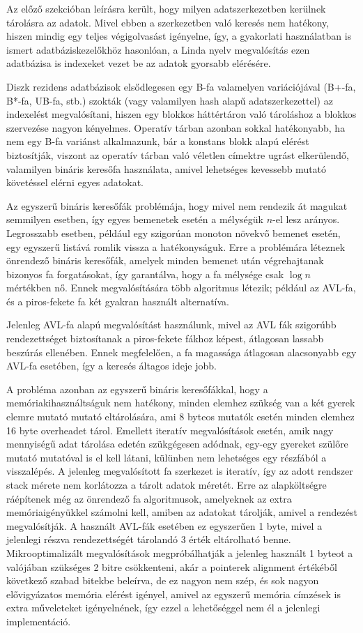 Az előző szekcióban leírásra került, hogy milyen adatszerkezetben kerülnek tárolásra az adatok.
Mivel ebben a szerkezetben való keresés nem hatékony, hiszen mindig egy teljes végigolvasást igényelne, így, a gyakorlati használatban is ismert adatbáziskezelőkhöz hasonlóan, a Linda nyelv megvalósítás ezen adatbázisa is indexeket vezet be az adatok gyorsabb elérésére.

Diszk rezidens adatbázisok elsődlegesen egy B-fa valamelyen variációjával (B+-fa, B*-fa, UB-fa, stb.) szokták (vagy valamilyen hash alapű adatszerkezettel) az indexelést megvalósítani, hiszen egy blokkos háttértáron való tároláshoz a blokkos szervezése nagyon kényelmes.
Operatív tárban azonban sokkal hatékonyabb, ha nem egy B-fa variánst alkalmazunk, bár a konstans blokk alapú elérést biztosítják, viszont az operatív tárban való véletlen címektre ugrást elkerülendő, valamilyen bináris keresőfa használata, amivel lehetséges kevessebb mutató követéssel elérni egyes adatokat.

Az egyszerű bináris keresőfák problémája, hogy mivel nem rendezik át magukat semmilyen esetben, így egyes bemenetek esetén a mélységük $n$-el lesz arányos. 
Legrosszabb esetben, például egy szigorúan monoton növekvő bemenet esetén, egy egyszerű listává romlik vissza a hatékonyságuk.
Erre a problémára léteznek önrendező bináris keresőfák, amelyek minden bemenet után végrehajtanak bizonyos fa forgatásokat, így garantálva, hogy a fa mélysége csak $\log{n}$ mértékben nő.
Ennek megvalósítására több algoritmus létezik; például az AVL-fa, és a piros-fekete fa két gyakran használt alternatíva.

Jelenleg AVL-fa alapú megvalósítást használunk, mivel az AVL fák szigorúbb rendezettséget biztosítanak a piros-fekete fákhoz képest, átlagosan lassabb beszúrás ellenében.
Ennek megfelelően, a fa magassága átlagosan alacsonyabb egy AVL-fa esetében, így a keresés áltagos ideje jobb.

A probléma azonban az egyszerű bináris keresőfákkal, hogy a memóriakihasználtságuk nem hatékony, minden elemhez szükség van a két gyerek elemre mutató mutató eltárolására, ami 8 byteos mutatók esetén minden elemhez 16 byte overheadet tárol.
Emellett iteratív megvalósítások esetén, amik nagy mennyiségű adat tárolása edetén szükgégesen adódnak, egy-egy gyereket szülőre mutató mutatóval is el kell látani, külünben nem lehetséges egy részfából a visszalépés.
A jelenleg megvalósított fa szerkezet is iteratív, így az adott rendszer stack mérete nem korlátozza a tárolt adatok méretét.
Erre az alapköltségre ráépítenek még az önrendező fa algoritmusok, amelyeknek az extra memóriaigényükkel számolni kell, amiben az adatokat tárolják, amivel a rendezést megvalósítják.
A használt AVL-fák esetében ez egyszerűen 1 byte, mivel a jelenlegi részva rendezettségét tárolandó 3 érték eltárolható benne.
Mikrooptimalizált megvalósítások megpróbálhatják a jelenleg használt 1 byteot a valójában szükséges 2 bitre csökkenteni, akár a pointerek alignment értékéből következő szabad bitekbe beleírva, de ez nagyon nem szép, és sok nagyon elővigyázatos memória elérést igényel, amivel az egyszerű memória címzések is extra műveleteket igényelnének, így ezzel a lehetőséggel nem él a jelenlegi implementáció. 

